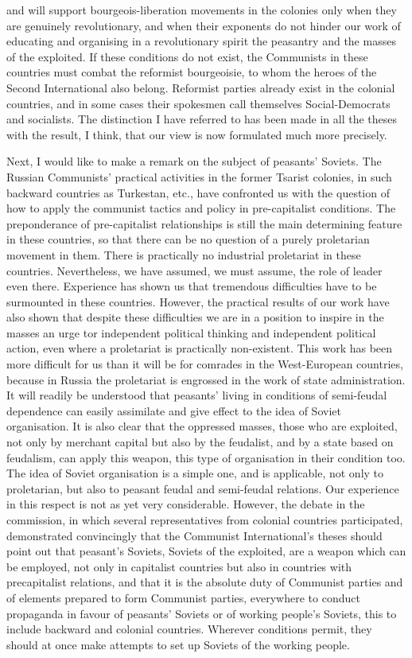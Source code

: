 and will support bourgeois-liberation movements in the colonies only when they are genuinely revolutionary, and when their exponents do not hinder our work of educating and organising in a revolutionary spirit the peasantry and the masses of the exploited. If these conditions do not exist, the Communists in these countries must combat the reformist bourgeoisie, to whom the heroes of the Second International also belong. Reformist parties already exist in the colonial countries, and in some cases their spokesmen call themselves Social-Democrats and socialists. The distinction I have referred to has been made in all the theses with the result, I think, that our view is now formulated much more precisely. 

Next, I would like to make a remark on the subject of peasants’ Soviets. The Russian Communists’ practical activities in the former Tsarist colonies, in such backward countries as Turkestan, etc., have confronted us with the question of how to apply the communist tactics and policy 
in pre-capitalist conditions. The preponderance of pre-capitalist relationships is still the main determining feature in these countries, so that there can be no question of a purely proletarian movement in them. There is practically no industrial proletariat in these countries. Nevertheless, we have assumed, we must assume, the role of leader even there. Experience has shown us that tremendous difficulties have 
to be surmounted in these countries. However, the practical results of our work have also shown that despite these difficulties we are in a position to inspire in the masses an urge tor independent political thinking and independent political action, even where a proletariat is practically non-existent. This work has been more difficult for us than it will be for comrades in the West-European countries, because in Russia the proletariat is engrossed in the work of state administration. It will readily be understood that peasants' living in 
conditions of semi-feudal dependence can easily assimilate and give effect to the idea of Soviet organisation. It is also clear that the oppressed masses, those who are exploited, not only by merchant capital but also by the feudalist, and by a state based on feudalism, can apply this weapon, this type of organisation in their condition too. The idea of Soviet organisation is a simple one, and is applicable, not only to 
proletarian, but also to peasant feudal and semi-feudal relations. Our experience in this respect is not as yet very considerable. However, the debate in the commission, in which several representatives from colonial countries participated, demonstrated convincingly that the Communist International’s theses should point out that peasant’s Soviets, Soviets of the exploited, are a weapon which can be employed, not only in capitalist countries but also in countries with precapitalist relations, and that it is the absolute duty of Communist parties and of elements prepared to form Communist parties, everywhere to conduct propaganda in favour of peasants’ Soviets or of working people’s Soviets, this to include backward and colonial countries. Wherever conditions permit, they should at once make attempts to set up Soviets of the working people. 

